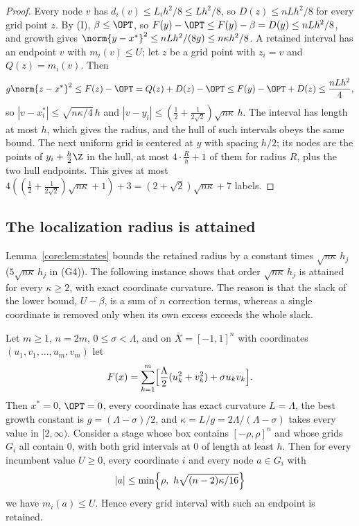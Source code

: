 \begin{proof}
Every node $v$ has $d_i(v)\le L_ih^2/8\le Lh^2/8$, so $D(z)\le nLh^2/8$
for every grid point $z$. By (I), $\beta\le\OPT$, so
$F(y)-\OPT\le F(y)-\beta=D(y)\le nLh^2/8$, and growth gives
$\norm{y-x^*}^2\le nLh^2/(8g)\le n\kappa h^2/8$. A retained interval has an
endpoint $v$ with $m_i(v)\le U$; let $z$ be a grid point with $z_i=v$ and
$Q(z)=m_i(v)$. Then
\[
g\norm{z-x^*}^2\le F(z)-\OPT=Q(z)+D(z)-\OPT\le F(y)-\OPT+D(z)
\le\frac{nLh^2}4,
\]
so $|v-x^*_i|\le\sqrt{n\kappa/4}\,h$ and $|v-y_i|\le
(\frac12+\frac1{2\sqrt2})\sqrt{n\kappa}\,h$. The interval has length at most
$h$, which gives the radius, and the hull of such intervals obeys the same
bound. The next uniform grid is centered at $y$ with spacing $h/2$; its
nodes are the points of $y_i+\frac h2\Z$ in the hull, at most
$4\cdot\frac Rh+1$ of them for radius $R$, plus the two hull endpoints. This
gives at most $4((\frac12+\frac1{2\sqrt2})\sqrt{n\kappa}+1)+3
=(2+\sqrt2)\sqrt{n\kappa}+7$ labels.
\end{proof}

\subsection{The localization radius is attained}

Lemma~\ref{core:lem:states} bounds the retained radius by a constant times
$\sqrt{n\kappa}\,h_j$ ($5\sqrt{n\kappa}\,h_j$ in (G4)). The following
instance shows that order $\sqrt{n\kappa}\,h_j$ is attained
for every $\kappa\ge2$, with exact coordinate curvature. The reason is that
the slack of the lower bound, $U-\beta$, is a sum of $n$ correction terms,
whereas a single coordinate is removed only when its own excess exceeds the
whole slack.

\begin{proposition}\label{exp:prop:sharp}
Let $m\ge1$, $n=2m$, $0\le\sigma<\Lambda$, and on $\bar X=[-1,1]^n$ with
coordinates $(u_1,v_1,\dots,u_m,v_m)$ let
\[
F(x)=\sum_{k=1}^m\Bigl[\frac\Lambda2(u_k^2+v_k^2)+\sigma u_kv_k\Bigr].
\]
Then $x^*=0$, $\OPT=0$, every coordinate has exact curvature $L=\Lambda$, the
best growth constant is $g=(\Lambda-\sigma)/2$, and
$\kappa=L/g=2\Lambda/(\Lambda-\sigma)$ takes every value in $[2,\infty)$.
Consider a stage whose box contains $[-\rho,\rho]^n$ and whose grids
$G_i$ all contain $0$, with both grid intervals at $0$ of length at least $h$.
Then for every incumbent value $U\ge0$, every coordinate $i$ and every node
$a\in G_i$ with
\[
|a|\le\min\Bigl\{\rho,\ h\sqrt{(n-2)\kappa/16}\Bigr\}
\]
we have $m_i(a)\le U$. Hence every grid interval with such an endpoint is
retained.
\end{proposition}

